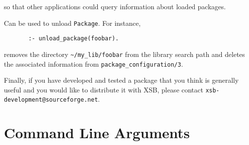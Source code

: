 
\noindent
so that other applications could query information about loaded
packages.

\begin{description}
Can be used to unload {\tt Package}.  For instance,

\begin{verbatim}
       :- unload_package(foobar).  
\end{verbatim}
removes the directory \verb|~/my_lib/foobar| from the library search
path and deletes the associated information from
\verb|package_configuration/3|.
\end{description}

Finally, if you have developed and tested a package that you think is
generally useful and you would like to distribute it with XSB, please
contact {\tt xsb-development@sourceforge.net}.


\section{Command Line Arguments} \label{sec:EmuOptions}

